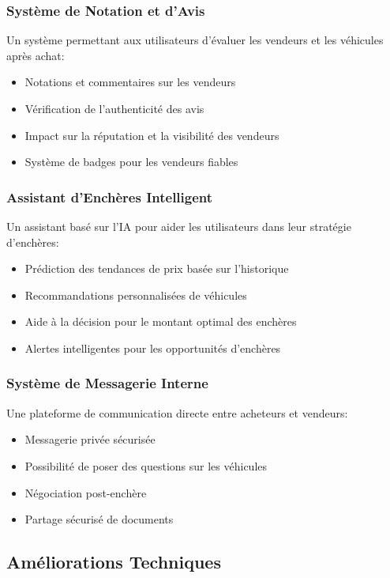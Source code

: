 \subsubsection{Système de Notation et d'Avis}
Un système permettant aux utilisateurs d'évaluer les vendeurs et les véhicules après achat:
\begin{itemize}
    \item Notations et commentaires sur les vendeurs
    \item Vérification de l'authenticité des avis
    \item Impact sur la réputation et la visibilité des vendeurs
    \item Système de badges pour les vendeurs fiables
\end{itemize}

\subsubsection{Assistant d'Enchères Intelligent}
Un assistant basé sur l'IA pour aider les utilisateurs dans leur stratégie d'enchères:
\begin{itemize}
    \item Prédiction des tendances de prix basée sur l'historique
    \item Recommandations personnalisées de véhicules
    \item Aide à la décision pour le montant optimal des enchères
    \item Alertes intelligentes pour les opportunités d'enchères
\end{itemize}

\subsubsection{Système de Messagerie Interne}
Une plateforme de communication directe entre acheteurs et vendeurs:
\begin{itemize}
    \item Messagerie privée sécurisée
    \item Possibilité de poser des questions sur les véhicules
    \item Négociation post-enchère
    \item Partage sécurisé de documents
\end{itemize}

\subsection{Améliorations Techniques}

